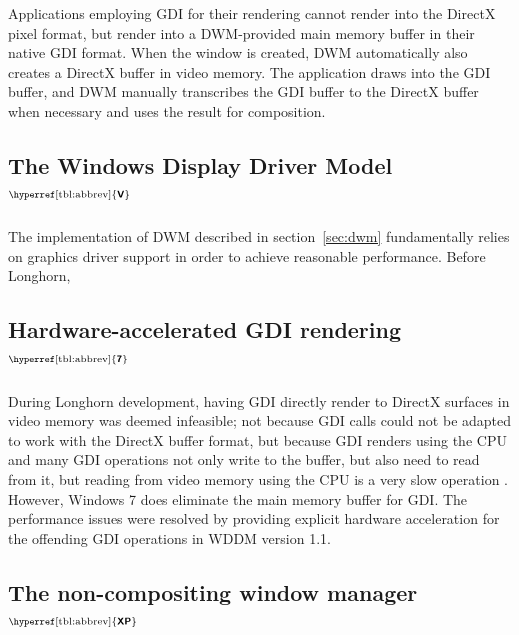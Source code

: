 \documentclass[10pt,twocolumn,a4paper,os=win]{article}
\newcommand{\bs}[1]{\textbf{\sffamily #1}}
\newcommand{\winver}[1]{$^{\text{\hyperref[tbl:abbrev]{\bs{#1}}}}$}
\begin{document}
			Applications employing GDI for their rendering cannot render into
			the DirectX pixel format, but render into a DWM-provided main memory
			buffer in their native GDI format. When the window is created, DWM
			automatically also creates a DirectX buffer in video memory. The
			application draws into the GDI buffer, and DWM manually transcribes
			the GDI buffer to the DirectX buffer when necessary and uses the result
			for composition.
			\cite{dwmredirect}

		\subsection{The Windows Display Driver Mo\-del\winver{V}}\label{sec:wddm}
			The implementation of DWM described in section~\ref{sec:dwm} fundamentally
			relies on graphics driver support in order to achieve reasonable performance.
			Before Longhorn, 
			\cite{dwmwddm}

		\subsection{Hardware-accelerated GDI ren\-der\-ing\winver{7}}
			During Longhorn development, having GDI directly render to DirectX
			surfaces in video memory was deemed infeasible; not because GDI calls
			could not be adapted to work with the DirectX buffer format, but because
			GDI renders using the CPU and many GDI operations not only write to
			the buffer, but also need to read from it, but reading from video memory
			using the CPU is a very slow operation \cite{dwmredirect}. However,
			Windows 7 does eliminate the main memory buffer for GDI. The performance
			issues were resolved by providing explicit hardware acceleration for
			the offending GDI operations in WDDM version 1.1. %
			\cite{win7}

		\subsection{The non-compositing window ma\-na\-ger\winver{XP}}

	\printbibliography
\end{document}
